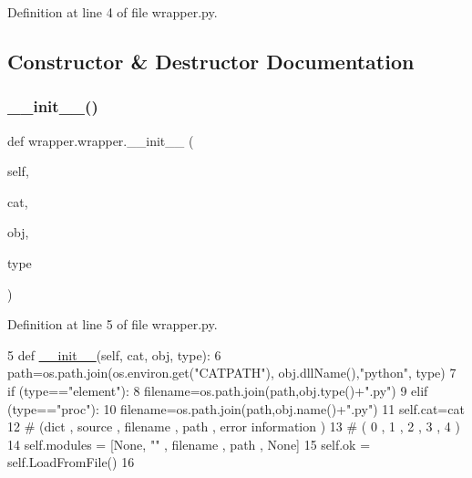 Definition at line 4 of file wrapper.\+py.



\subsection{Constructor \& Destructor Documentation}
\mbox{\label{classwrapper_1_1wrapper_a0709d1d42877783bb4f7d84adc34b1ad}} 
\subsubsection{\texorpdfstring{\+\_\+\+\_\+init\+\_\+\+\_\+()}{\_\_init\_\_()}}
{\footnotesize\ttfamily def wrapper.\+wrapper.\+\_\+\+\_\+init\+\_\+\+\_\+ (\begin{DoxyParamCaption}\item[{}]{self,  }\item[{}]{cat,  }\item[{}]{obj,  }\item[{}]{type }\end{DoxyParamCaption})}



Definition at line 5 of file wrapper.\+py.


\begin{DoxyCode}
5     \textcolor{keyword}{def }\hyperlink{classwrapper_1_1ModuleDictWrapper_a9a7a794150502f51df687831583e13b9}{\_\_init\_\_}(self, cat, obj, type):
6         path=os.path.join(os.environ.get(\textcolor{stringliteral}{"CATPATH"}), obj.dllName(),\textcolor{stringliteral}{"python"}, type)
7         \textcolor{keywordflow}{if} (type==\textcolor{stringliteral}{"element"}):
8             filename=os.path.join(path,obj.type()+\textcolor{stringliteral}{".py"})
9         \textcolor{keywordflow}{elif} (type==\textcolor{stringliteral}{"proc"}):
10             filename=os.path.join(path,obj.name()+\textcolor{stringliteral}{".py"})
11         self.cat=cat
12         \textcolor{comment}{#              (dict , source ,  filename , path , error information )}
13         \textcolor{comment}{#              (  0  ,   1    ,     2     ,    3 ,       4        )}
14         self.modules =  [\textcolor{keywordtype}{None},  \textcolor{stringliteral}{""}    ,  filename , path ,     \textcolor{keywordtype}{None}]
15         self.ok = self.LoadFromFile()
16 
\end{DoxyCode}


